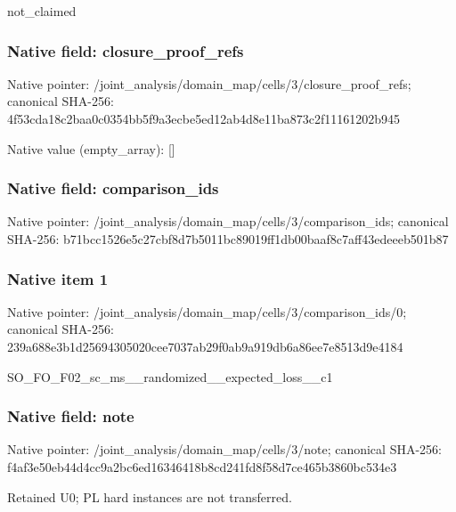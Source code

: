 \documentclass[10pt,a4paper]{article}
\begin{document}
\begingroup\raggedright\sloppy not\_\allowbreak{}claimed\par\endgroup

\subsubsection{Native field: closure\_\allowbreak{}proof\_\allowbreak{}refs}
Native pointer: /joint\_\allowbreak{}analysis/domain\_\allowbreak{}map/cells/3/closure\_\allowbreak{}proof\_\allowbreak{}refs; canonical SHA-256: 4f53cda18c2baa0c0354bb5f9a3ecbe5ed12ab4d8e11ba873c2f11161202b945

Native value (empty\_\allowbreak{}array): []

\subsubsection{Native field: comparison\_\allowbreak{}ids}
Native pointer: /joint\_\allowbreak{}analysis/domain\_\allowbreak{}map/cells/3/comparison\_\allowbreak{}ids; canonical SHA-256: b71bcc1526e5c27cbf8d7b5011bc89019ff1db00baaf8c7aff43edeeeb501b87

\subsubsection{Native item 1}
Native pointer: /joint\_\allowbreak{}analysis/domain\_\allowbreak{}map/cells/3/comparison\_\allowbreak{}ids/0; canonical SHA-256: 239a688e3b1d25694305020cee7037ab29f0ab9a919db6a86ee7e8513d9e4184

\begingroup\raggedright\sloppy SO\_\allowbreak{}FO\_\allowbreak{}F02\_\allowbreak{}sc\_\allowbreak{}ms\_\allowbreak{}\_\allowbreak{}randomized\_\allowbreak{}\_\allowbreak{}expected\_\allowbreak{}loss\_\allowbreak{}\_\allowbreak{}c1\par\endgroup

\subsubsection{Native field: note}
Native pointer: /joint\_\allowbreak{}analysis/domain\_\allowbreak{}map/cells/3/note; canonical SHA-256: f4af3e50eb44d4cc9a2bc6ed16346418b8cd241fd8f58d7ce465b3860bc534e3

\begingroup\raggedright\sloppy Retained U0;\allowbreak{} PL hard instances are not transferred.\par\endgroup
\end{document}
